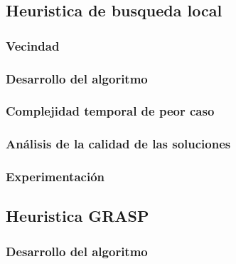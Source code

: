 \documentclass[a4paper, 10pt, twoside]{article}
\begin{document}
  \subsection{Heuristica de busqueda local}
  \label{sub:algoritmos-heuristicos-busqueda}
      
      \label{subsub:algoritmos-heuristicos-busqueda-introduccion_busqueda.tex}
      
            
      \subsubsection{Vecindad}
      \label{subsub:algoritmos-heuristicos-busqueda-desarrollo_vecindad.tex}
      

      \subsubsection{Desarrollo del algoritmo}
      \label{subsub:algoritmos-heuristicos-busqueda-desarrollo_algoritmo.tex}
      
      
      \subsubsection{Complejidad temporal de peor caso}
      \label{subsub:algoritmos-heuristicos-busqueda-complejidad.tex}
      

      \subsubsection{Análisis de la calidad de las soluciones}
      \label{subsub:algoritmos-heuristicos-busqueda-calidad.tex}
      

      \subsubsection{Experimentación}
      \label{subsub:algoritmos-heuristicos-busqueda-experimentacion.tex}
      
  \newpage

  \subsection{Heuristica GRASP}
  \label{sub:algoritmos-heuristicos-grasp}
      \subsubsection{Desarrollo del algoritmo}
      \label{subsub:algoritmos-heuristicos-grasp-desarrollo.tex}
      
\end{document}

